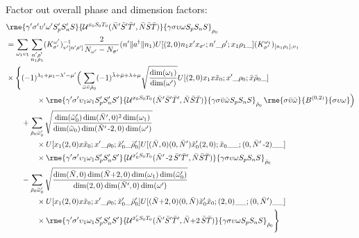 \documentclass[%
  aps,%
  prc,%
  showpacs,%
  superscriptaddress,%
  onecolumn,%
  notitlepage,%
  11pt,%
  floatfix,%
  amsmath,%
  amssymb,%
]{revtex4-2}
\newcommand{\negative}{\,\text{-}}
\newcommand{\plus}{\text{+}}
\begin{document}
Factor out overall phase and dimension factors:
\begin{align*}
  &
  \rme{\gamma'\sigma'\upsilon'\omega'S_p'S_n'S}{\mathcal{U}^{x_0 S_0 T_0}(\bar{N}'\bar{S}'\bar{T}',\bar{N}\bar{S}\bar{T})}{\gamma\sigma\upsilon\omega S_p S_n S}_{\rho_0}\\
  &=\sum_{\omega_1\upsilon_1} \sum_{\substack{n'\rho'\\n_1\rho_1}}(K_{\sigma'}^{\omega'})_{\upsilon'[n'\rho']}^{-1}\frac{2}{N_{\omega'} - N_{\sigma'}}(n'\Vert{}a^\dagger\Vert{}n_1) U[(2,0)n_1 x' x_{\sigma'};n'\_\rho';x_1\rho_1\_](K_{\sigma'}^{\omega_1})_{[n_1\rho_1],\upsilon_1}\\
  &\times\Bigg\{(-1)^{\lambda_1+\mu_1-\lambda'-\mu'}\Big(\sum_{\bar{\omega}\bar{\upsilon}\bar{\rho}_0}
      (-1)^{\bar{\lambda}+\bar{\mu}+\lambda+\mu}
      \sqrt{\frac{\dim(\omega_1)}{\dim(\omega')}}
      U[(2,0) x_1 x \tilde{x}_0; x' \_ \rho_0; \bar{x}\bar{\rho}_0\_]
      \\
      & \qquad \qquad \times
      \rme{\gamma'\sigma'\upsilon_1\omega_1 S_p' S_n' S'}{\mathcal{U}^{x_0S_0T_0}(\bar{N}'\bar{S}'\bar{T}',\bar{N}\bar{S}\bar{T})}{\gamma \sigma \bar{\upsilon}\bar{\omega} S_p S_n S}_{\bar{\rho}_0} \, \rme{\sigma \bar{\upsilon}\bar{\omega}}{B^{(0,2)}}{\sigma \upsilon \omega}
    \Big)\\
  &\qquad+\sum_{\bar{\rho}_0\tilde{\omega}_0'}
  \sqrt{\frac{\dim(\tilde{\omega}_0')\dim(\bar{N}',0)^2\dim(\omega_1)}{\dim(\tilde{\omega}_0)\dim(\bar{N}'\negative2,0)\dim(\omega')}}\\
  & \qquad \qquad \times
  U[x_1 (2,0) x \tilde{x}_0; x'\_\rho_0;\tilde{x}_0'\_\bar{\rho}_0']
  U[(\bar{N},0) (0,\bar{N}') \tilde{x}_0' (2,0);\tilde{x}_0\_\_;(0,\bar{N}'\negative2)\_\_]
  \\
  & \qquad \qquad \times
  \rme{\gamma'\sigma'\upsilon_1\omega_1 S_p' S_n' S'}{\mathcal{U}^{x_0'S_0T_0}(\bar{N}'\negative2\,\bar{S}'\bar{T}',\bar{N}\bar{S}\bar{T})}{\gamma \sigma \upsilon \omega S_p S_n S}_{\bar{\rho}_0}\\
  &\qquad-\sum_{\bar{\rho}_0\tilde{\omega}_0'}
  \sqrt{\frac{\dim(\bar{N},0)\dim(\bar{N}\plus2,0)\dim(\omega_1)\dim(\tilde{\omega}_0')}{\dim(2,0)\dim(\bar{N}',0)\dim(\omega')}}\\
  & \qquad \qquad \times
  U[x_1 (2,0) x \tilde{x}_0; x'\_\rho_0;\tilde{x}_0'\_\bar{\rho}_0']
  U[(\bar{N}\plus2,0)(0,\bar{N}) \tilde{x}_0' \tilde{x}_0;(2,0)\_\_;(0,\bar{N}')\_\_]
  \\
  & \qquad \qquad \times
  \rme{\gamma'\sigma'\upsilon_1\omega_1S_p'S_n'S'}{\mathcal{U}^{\tilde{x}_0' S_0 T_0}(\bar{N}'\bar{S}'\bar{T}',\bar{N}\plus2\,\bar{S}\bar{T})}{\gamma \sigma \upsilon \omega S_p S_n S}_{\bar{\rho}_0}
  \Bigg\}
\end{align*}
\end{document}
